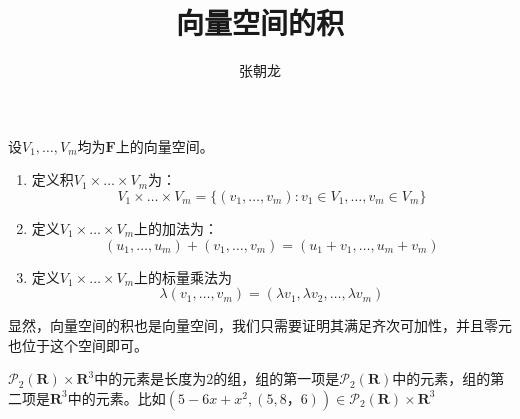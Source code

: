 \documentclass[10pt,a4paper,UTF8]{article}
\author{张朝龙}
\date{}
\title{向量空间的积}
\begin{document}
\maketitle
\tableofcontents
{}
\begin{definition}
设\(V_{1},\ldots ,V_{m}\)均为\(\mathbf{F}\)上的向量空间。

\begin{enumerate}
\item 定义积\(V_{1}\times \ldots \times V_{m}\)为：\[V_{1}\times \ldots \times V_{m} = \{(v_{1},\ldots ,v_{m}):v_{1}\in V_{1},\ldots ,v_{m}\in V_{m}\}\]
\item 定义\(V_{1}\times \ldots \times V_{m}\)上的加法为：\[(u_{1},\ldots ,u_{m}) + (v_{1},\ldots ,v_{m}) = (u_{1}+v_{1},\ldots ,u_{m}+v_{m})\]
\item 定义\(V_{1}\times \ldots \times V_{m}\)上的标量乘法为\[\lambda (v_{1},\ldots ,v_{m}) = (\lambda v_{1}, \lambda v_{2}, \ldots ,\lambda v_{m})\]
\end{enumerate}
\end{definition}

显然，向量空间的积也是向量空间，我们只需要证明其满足齐次可加性，并且零元也位于这个空间即可。

\begin{instance}
\(\mathcal{P}_{2}( \mathbf{R}) \times \mathbf{R}^{3}\)中的元素是长度为\(2\)的组，组的第一项是\(\mathcal{P}_{2}( \mathbf{R})\)中的元素，组的第二项是\(\mathbf{R}^{3}\)中的元素。比如\((5-6x+x^{2},(5,8，6))\in \mathcal{P}_{2}( \mathbf{R}) \times \mathbf{R}^{3}\)
\end{instance}
\end{document}
